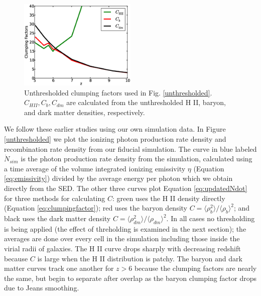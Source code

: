 \begin{figure}
	\includegraphics[width=0.5\textwidth]{unthreshclumping.eps}
	\caption{Unthresholded clumping factors used in Fig. \ref{unthresholded}. $C_{HII}, C_b, C_{dm}$ are calculated from the unthresholded H \footnotesize{II}, baryon, and dark matter densities, respectively.}
	\label{unthreshclumping}
\end{figure}

We follow these earlier studies using our own simulation data.  In Figure \ref{unthresholded} we plot the ionizing photon production rate density and recombination rate density from our fiducial simulation.  The curve in blue labeled $\dot{N}_{sim}$ is the photon production rate density from the simulation, calculated using a time average of the volume integrated ionizing emissivity $\eta$ (Equation \eqref{eq:emissivity}) divided by the average energy per photon which we obtain directly from the SED.  The other three curves plot Equation \eqref{eq:updatedNdot} for three methods for calculating $C$: green uses the H {\footnotesize II} density directly (Equation \eqref{eq:clumpingfactor}); red uses the baryon density $C=\langle \rho^2_b \rangle / \langle \rho_b \rangle^2$; and black uses the dark matter density $C=\langle \rho^2_{dm} \rangle / \langle \rho_{dm} \rangle^2$. In all cases no thresholding is being applied (the effect of threholding is examined in the next section); the averages are done over every cell in the simulation including those inside the virial radii of galaxies. The H {\footnotesize II} curve drops sharply with decreasing redshift because $C$ is large when the H {\footnotesize II} distribution is patchy. The baryon and dark matter curves track one another for $z > 6$ because the clumping factors are nearly the same, but begin to separate after overlap as the baryon clumping factor drops due to Jeans smoothing.  

